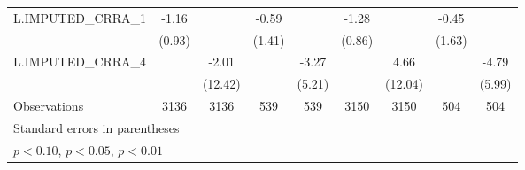 {\begin{tabular}{l*{8}{c}}
\midrule
L.IMPUTED\_CRRA\_1&    -1.16         &                  &    -0.59         &                  &    -1.28         &                  &    -0.45         &                  \\
                &   (0.93)         &                  &   (1.41)         &                  &   (0.86)         &                  &   (1.63)         &                  \\
\addlinespace
L.IMPUTED\_CRRA\_4&                  &    -2.01         &                  &    -3.27         &                  &     4.66         &                  &    -4.79         \\
                &                  &  (12.42)         &                  &   (5.21)         &                  &  (12.04)         &                  &   (5.99)         \\
\midrule
Observations    &     3136         &     3136         &      539         &      539         &     3150         &     3150         &      504         &      504         \\
\bottomrule
\multicolumn{9}{l}{\footnotesize Standard errors in parentheses}\\
\multicolumn{9}{l}{\footnotesize \sym{*} \(p<0.10\), \sym{**} \(p<0.05\), \sym{***} \(p<0.01\)}\\
\end{tabular}
}
